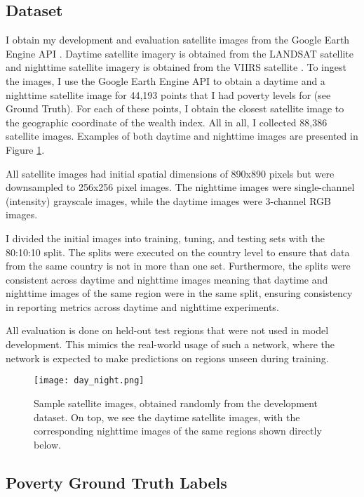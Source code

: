 \documentclass{article}
\begin{document}
\subsection{Dataset}
I obtain my development and evaluation satellite images from the Google Earth Engine API \cite{fifteen}. Daytime satellite imagery is obtained from the LANDSAT satellite \cite{sixteen} and nighttime satellite imagery is obtained from the VIIRS satellite \cite{seventeen}. To ingest the images, I use the Google Earth Engine API to obtain a daytime and a nighttime satellite image for 44,193 points that I had poverty levels for (see Ground Truth). For each of these points, I obtain the closest satellite image to the geographic coordinate of the wealth index. All in all, I collected 88,386 satellite images. Examples of both daytime and nighttime images are presented in Figure \ref{fig:night_day}.

All satellite images had initial spatial dimensions of 890x890 pixels but were downsampled to 256x256 pixel images. The nighttime images were single-channel (intensity) grayscale images, while the daytime images were 3-channel RGB images.

I divided the initial images into training, tuning, and testing sets with the 80:10:10 split. The splits were executed on the country level to ensure that data from the same country is not in more than one set. Furthermore, the splits were consistent across daytime and nighttime images meaning that daytime and nighttime images of the same region were in the same split, ensuring consistency in reporting metrics across daytime and nighttime experiments.

All evaluation is done on held-out test regions that were not used in model development. This mimics the real-world usage of such a network, where the network is expected to make predictions on regions unseen during training.

\begin{figure}[t]
    \centering
    \texttt{[image: day\_night.png]}
    \caption{Sample satellite images, obtained randomly from the development dataset. On top, we see the daytime satellite images, with the corresponding nighttime images of the same regions shown directly below.}
    \label{fig:night_day}
\end{figure}


\subsection{Poverty Ground Truth Labels}
\end{document}
